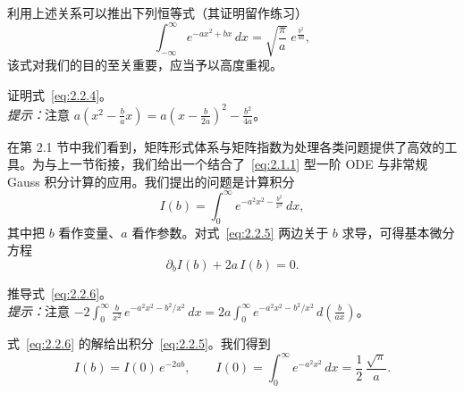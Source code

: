 利用上述关系可以推出下列恒等式（其证明留作练习）
\begin{equation}
\int_{-\infty}^{\infty}e^{-a x^{2}+b x}\,dx
=\sqrt{\frac{\pi}{a}}\;e^{\frac{b^{2}}{4a}},
\label{eq:2.2.4}
\end{equation}
该式对我们的目的至关重要，应当予以高度重视。

\begin{exercise}
证明式~\eqref{eq:2.2.4}。\\
\textit{提示：}注意 $a\!\left(x^{2}-\frac{b}{a}x\right)=a\!\left(x-\frac{b}{2a}\right)^{2}-\frac{b^{2}}{4a}$。
\end{exercise}

在第 2.1 节中我们看到，矩阵形式体系与矩阵指数为处理各类问题提供了高效的工具。为与上一节衔接，我们给出一个结合了~\eqref{eq:2.1.1} 型一阶 ODE 与非常规 Gauss 积分计算的应用。我们提出的问题是计算积分
\begin{equation}
I(b)=\int_{0}^{\infty}e^{-a^{2}x^{2}-\frac{b^{2}}{x^{2}}}\,dx,
\label{eq:2.2.5}
\end{equation}
其中把 $b$ 看作变量、$a$ 看作参数。对式~\eqref{eq:2.2.5} 两边关于 $b$ 求导，可得基本微分方程
\begin{equation}
\partial_{b}I(b)+2a\,I(b)=0.
\label{eq:2.2.6}
\end{equation}

\begin{exercise}
推导式~\eqref{eq:2.2.6}。\\
\textit{提示：}注意
$-2\int_{0}^{\infty}\frac{b}{x^{2}}\,e^{-a^{2}x^{2}-b^{2}/x^{2}}\,dx
=2a\int_{0}^{\infty}e^{-a^{2}x^{2}-b^{2}/x^{2}}\,d\!\left(\frac{b}{ax}\right)$。
\end{exercise}

式~\eqref{eq:2.2.6} 的解给出积分~\eqref{eq:2.2.5}。我们得到
\begin{equation}
I(b)=I(0)\,e^{-2ab},\qquad
I(0)=\int_{0}^{\infty}e^{-a^{2}x^{2}}\,dx=\frac{1}{2}\,\frac{\sqrt{\pi}}{a}.
\label{eq:2.2.7}
\end{equation}

